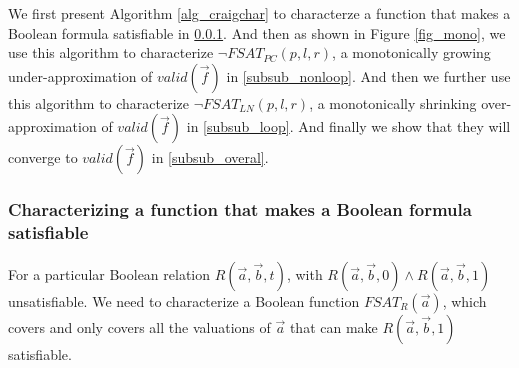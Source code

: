 \documentclass[runningheads,a4paper,orivec]{llncs}
\begin{document}

We first present Algorithm \ref{alg_craigchar} to characterze a function 
that makes a Boolean formula satisfiable in \ref{subsubsec_craig}.
And then as shown in Figure \ref{fig_mono},
we use this algorithm to characterize $\neg FSAT_{PC}(p,l,r)$,
a monotonically growing under-approximation of $valid(\vec{f})$ in \ref{subsub_nonloop}.
And then we further use this algorithm to characterize $\neg FSAT_{LN}(p,l,r)$,
a monotonically shrinking over-approximation of $valid(\vec{f})$ in \ref{subsub_loop}.
And finally we show that they will converge to $valid(\vec{f})$ in \ref{subsub_overal}.



\subsubsection{Characterizing a function that makes a Boolean formula satisfiable}\label{subsubsec_craig}

For a particular Boolean relation $R(\vec{a},\vec{b},t)$, 
with $R(\vec{a},\vec{b},0)\wedge R(\vec{a},\vec{b},1)$ unsatisfiable.
We need to characterize a Boolean function $FSAT_R(\vec{a})$,
which covers and only covers all the valuations of $\vec{a}$ 
that can make $R(\vec{a},\vec{b},1)$ satisfiable.

% 


\end{document}
